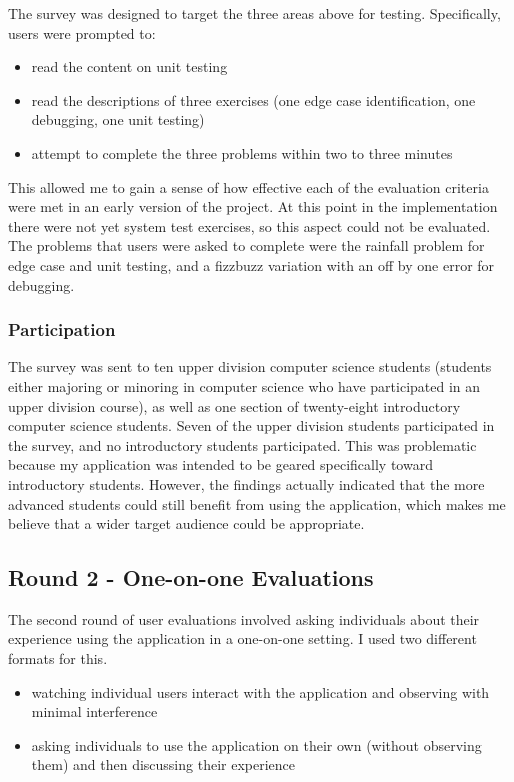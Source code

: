 \documentclass[10pt,twocolumn]{article}
\begin{document}
The survey was designed to target the three areas above for testing. Specifically, users were prompted to:

\begin{itemize}
    \item read the content on unit testing
    \item read the descriptions of three exercises (one edge case identification, one debugging, one unit testing)
    \item attempt to complete the three problems within two to three minutes
\end{itemize}

This allowed me to gain a sense of how effective each of the evaluation criteria were met in an early version of the project.
At this point in the implementation there were not yet system test exercises, so this aspect could not be evaluated. The 
problems that users were asked to complete were the rainfall problem for edge case and unit testing, and a fizzbuzz 
variation with an off by one error for debugging. 

\subsubsection{Participation}

The survey was sent to ten upper division computer science students (students either majoring or minoring in computer science
who have participated in an upper division course), as well as one section of twenty-eight introductory computer science students.
Seven of the upper division students participated in the survey, and no introductory students participated. This was problematic 
because my application was intended to be geared specifically toward introductory students. However, the findings actually 
indicated that the more advanced students could still benefit from using the application, which makes me believe that a wider 
target audience could be appropriate.



\subsection{Round 2 - One-on-one Evaluations}

The second round of user evaluations involved asking individuals about their experience using the application in a one-on-one 
setting. I used two different formats for this. 
\begin{itemize}
    \item watching individual users interact with the application and observing with minimal interference
    \item asking individuals to use the application on their own (without observing them) and then discussing their experience
\end{itemize}
\end{document}
